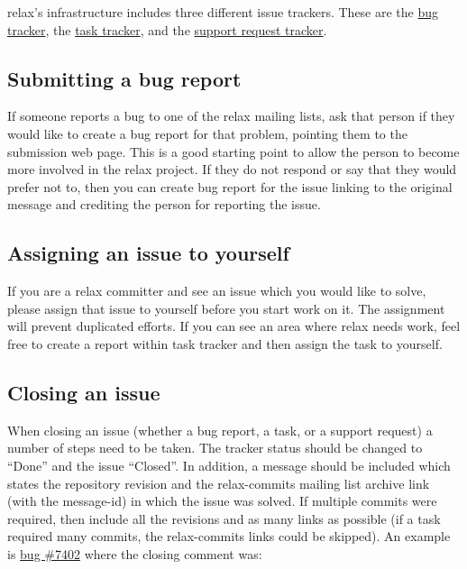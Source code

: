 relax's infrastructure includes three different issue trackers.
These are the \href{https://web.archive.org/web/https://gna.org/bugs/?group=relax}{bug tracker}, the \href{https://web.archive.org/web/https://gna.org/task/?group=relax}{task tracker}, and the \href{https://web.archive.org/web/https://gna.org/support/?group=relax}{support request tracker}.



\subsection{Submitting a bug report}

If someone reports a bug to one of the relax mailing lists, ask that person if they would like to create a bug report for that problem, pointing them to the submission web page.
This is a good starting point to allow the person to become more involved in the relax project.
If they do not respond or say that they would prefer not to, then you can create bug report for the issue linking to the original message and crediting the person for reporting the issue.



\subsection{Assigning an issue to yourself}

If you are a relax committer and see an issue which you would like to solve, please assign that issue to yourself before you start work on it.
The assignment will prevent duplicated efforts.
If you can see an area where relax needs work, feel free to create a report within task tracker and then assign the task to yourself.



\subsection{Closing an issue}

When closing an issue (whether a bug report, a task, or a support request) a number of steps need to be taken.
The tracker status should be changed to ``Done'' and the issue ``Closed''.
In addition, a message should be included which states the repository revision and the relax-commits mailing list archive link (with the message-id) in which the issue was solved.
If multiple commits were required, then include all the revisions and as many links as possible (if a task required many commits, the relax-commits links could be skipped).
An example is \href{https://web.archive.org/web/https://gna.org/bugs/?7402}{bug \#7402} where the closing comment was:


